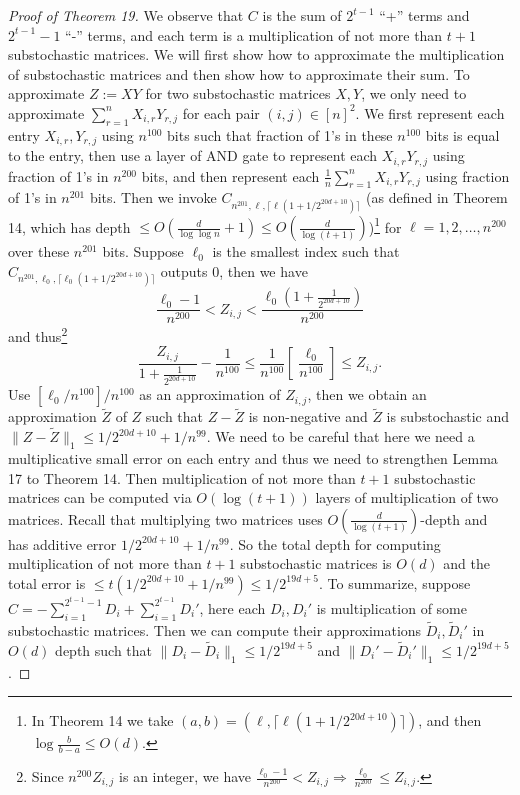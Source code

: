 \documentclass[10pt,a4paper]{article}
\begin{document}
\begin{proof}[Proof of Theorem 19]
We observe that $C$ is the sum of $2^{t-1}$ ``+'' terms and $2^{t-1}-1$ ``-'' terms, and each term is a multiplication of not more than $t+1$ substochastic matrices. We will first show how to approximate the multiplication of substochastic matrices and then show how to approximate their sum.
To approximate $Z:=XY$ for two substochastic matrices $X,Y$, we only need to approximate $\sum_{r=1}^n X_{i,r}Y_{r,j}$ for each pair $(i,j)\in[n]^2$. We first represent each entry $X_{i,r},Y_{r,j}$ using $n^{100}$ bits such that fraction of 1's in these $n^{100}$ bits is equal to the entry, then use a layer of AND gate to represent each $X_{i,r}Y_{r,j}$ using fraction of 1's in $n^{200}$ bits, and then represent each $\frac1n\sum_{r=1}^n X_{i,r}Y_{r,j}$ using fraction of 1's in $n^{201}$ bits. Then we invoke $C_{n^{201},\ell,\lceil\ell(1+1/2^{20d+10})\rceil}$ (as defined in Theorem 14, which has depth $\le O(\frac d{\log\log n}+1)\le O(\frac d{\log(t+1)})$)\footnote{In Theorem 14 we take $(a,b)=(\ell,\lceil\ell(1+1/2^{20d+10})\rceil)$, and then $\log\frac b{b-a}\le O(d)$.} for $\ell=1,2,\ldots,n^{200}$ over these $n^{201}$ bits. Suppose $\ell_0$ is the smallest index such that $C_{n^{201},\ell_0,\lceil\ell_0(1+1/2^{20d+10})\rceil}$ outputs 0, then we have
\[\frac{\ell_0-1}{n^{200}}<Z_{i,j}<\frac{\ell_0(1+\frac1{2^{20d+10}})}{n^{200}}\]
and thus\footnote{Since $n^{200}Z_{i,j}$ is an integer, we have $\frac{\ell_0-1}{n^{200}}<Z_{i,j}\Longrightarrow\frac{\ell_0}{n^{200}}\le Z_{i,j}$.}
\[\frac{Z_{i,j}}{1+\frac1{2^{20d+10}}}-\frac1{n^{100}}\le\frac1{n^{100}}\left[\frac{\ell_0}{n^{100}}\right]\le Z_{i,j}.\]
Use $[\ell_0/n^{100}]/n^{100}$ as an approximation of $Z_{i,j}$, then we obtain an approximation $\widetilde Z$ of $Z$ such that $Z-\widetilde Z$ is non-negative and $\widetilde Z$ is substochastic and $\|Z-\widetilde Z\|_1\le1/2^{20d+10}+1/n^{99}$. We need to be careful that here we need a multiplicative small error on each entry and thus we need to strengthen Lemma 17 to Theorem 14.
Then multiplication of not more than $t+1$ substochastic matrices can be computed via $O(\log(t+1))$ layers of multiplication of two matrices. Recall that multiplying two matrices uses $O(\frac d{\log(t+1)})$-depth and has additive error $1/2^{20d+10}+1/n^{99}$. So the total depth for computing multiplication of not more than $t+1$ substochastic matrices is $O(d)$ and the total error is $\le t(1/2^{20d+10}+1/n^{99})\le1/2^{19d+5}$.
To summarize, suppose $C=-\sum_{i=1}^{2^{t-1}-1}D_i+\sum_{i=1}^{2^{t-1}}D_i'$, here each $D_i,D_i'$ is multiplication of some substochastic matrices. Then we can compute their approximations $\widetilde D_i,\widetilde D_i'$ in $O(d)$ depth such that $\|D_i-\widetilde D_i\|_1\le1/2^{19d+5}$ and $\|D_i'-\widetilde D_i'\|_1\le1/2^{19d+5}$.

\end{proof}
\end{document}
